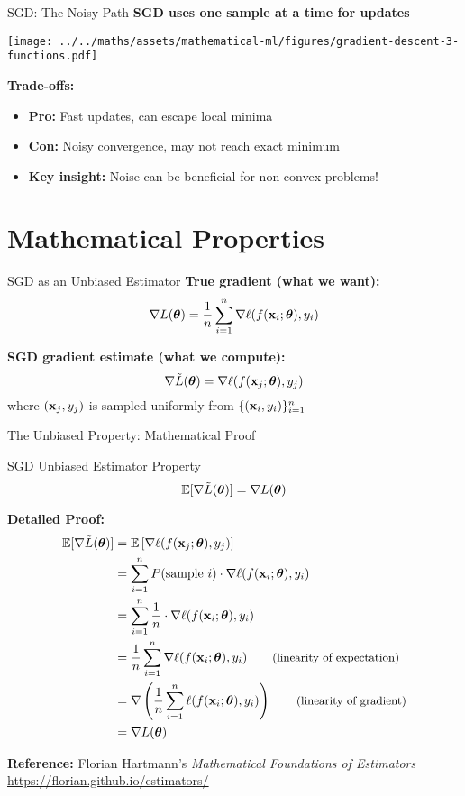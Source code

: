\documentclass[usenames,dvipsnames]{beamer}
\newcommand{\E}{\mathbb{E}}
\begin{document}
  \begin{frame}{SGD: The Noisy Path}
    \textbf{SGD uses one sample at a time for updates}
    
    \begin{center}
    \texttt{[image: ../../maths/assets/mathematical-ml/figures/gradient-descent-3-functions.pdf]}
    \end{center}
    
    \pause
    \textbf{Trade-offs:}
    \begin{itemize}[<+->]
        \item \textbf{Pro:} Fast updates, can escape local minima
        \item \textbf{Con:} Noisy convergence, may not reach exact minimum
        \item \textbf{Key insight:} Noise can be beneficial for non-convex problems!
    \end{itemize}
  \end{frame}

  \section{Mathematical Properties}

  \begin{frame}{SGD as an Unbiased Estimator}
    \textbf{True gradient (what we want):}
    $$\nabla L(\boldsymbol{\theta}) = \frac{1}{n}\sum_{i=1}^n \nabla \ell(f(\mathbf{x}_i;\boldsymbol{\theta}),y_i)$$

    \pause
    \textbf{SGD gradient estimate (what we compute):}
    $$\nabla \tilde{L}(\boldsymbol{\theta}) = \nabla \ell(f(\mathbf{x}_j;\boldsymbol{\theta}),y_j)$$
    where $(\mathbf{x}_j,y_j)$ is sampled uniformly from $\{(\mathbf{x}_i,y_i)\}_{i=1}^n$
  \end{frame}

  \begin{frame}{The Unbiased Property: Mathematical Proof}
    \begin{theorembox}{SGD Unbiased Estimator Property}
    $$\E[\nabla \tilde{L}(\vtheta)] = \nabla L(\vtheta)$$
    \end{theorembox}

    \pause
    \textbf{Detailed Proof:}
    \begin{align}
    \E[\nabla \tilde{L}(\vtheta)] &= \E\left[\nabla \ell(f(\vx_j;\vtheta),y_j)\right]\\
    &= \sum_{i=1}^n P(\text{sample } i) \cdot \nabla \ell(f(\vx_i;\vtheta),y_i)\\
    &= \sum_{i=1}^n \frac{1}{n} \cdot \nabla \ell(f(\vx_i;\vtheta),y_i)\\
    &= \frac{1}{n}\sum_{i=1}^n \nabla \ell(f(\vx_i;\vtheta),y_i) \qquad \text{\small (linearity of expectation)}\\
    &= \nabla \left(\frac{1}{n}\sum_{i=1}^n \ell(f(\vx_i;\vtheta),y_i)\right) \qquad \text{\small (linearity of gradient)}\\
    &= \nabla L(\vtheta)
    \end{align}

    \pause
    \textbf{Reference:} Florian Hartmann's \emph{Mathematical Foundations of Estimators} \\
    \url{https://florian.github.io/estimators/}
  \end{frame}
\end{document}
